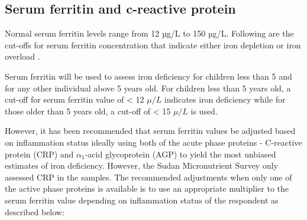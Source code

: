 \documentclass[12pt,a4paper]{article}
\begin{document}
\hypertarget{serum-ferritin-and-c-reactive-protein}{%
\subsection{Serum ferritin and c-reactive protein}\label{serum-ferritin-and-c-reactive-protein}}

Normal serum ferritin levels range from 12 µg/L to 150 µg/L. Following are the cut-offs for serum ferritin concentration that indicate either iron depletion or iron overload \citep{WorldHealthOrganization:2007tx, Gorstein:2007wn, Wegmuller:2020bw, WorldHealthOrganization:2011ue}.

\begin{table}[H]

\caption{\label{tab:ferritin}Relative extent of iron stores on the basis of serum ferritin concentration (µg/L)}
\centering
{}
\end{table}

Serum ferritin will be used to assess iron deficiency for children less than 5 and for any other individual above 5 years old. For children less than 5 years old, a cut-off for serum ferritin value of \textless{} 12 \(\mu/L\) indicates iron deficiency while for those older than 5 years old, a cut-off of \textless{} 15 \(\mu/L\) is used.

However, it has been recommended that serum ferritin values be adjusted based on inflammation status ideally using both of the acute phase proteins - C-reactive protein (CRP) and \(\alpha_1\)-acid glycoprotein (AGP) to yield the most unbiased estimates of iron deficiency. However, the Sudan Micronutrient Survey only assessed CRP in the samples. The recommended adjustments when only one of the active phase proteins is available is to use an appropriate multiplier to the serum ferritin value depending on inflammation status of the respondent as described below:
\end{document}
